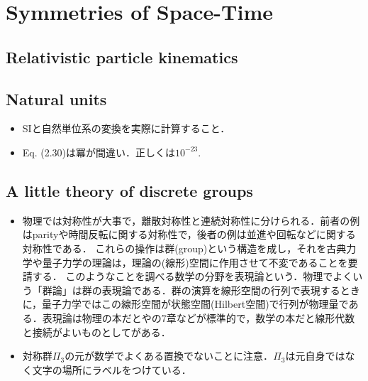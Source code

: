 \section{Symmetries of Space-Time}
\subsection{Relativistic particle kinematics}
\subsection{Natural units}
\begin{itemize}
		\item SIと自然単位系の変換を実際に計算すること．

		\item Eq. (2.30)は冪が間違い．正しくは$10^{-23} $.
\end{itemize}
\subsection{A little theory of discrete groups}
\begin{itemize}
	\item 物理では対称性が大事で，離散対称性と連続対称性に分けられる．前者の例はparityや時間反転に関する対称性で，後者の例は並進や回転などに関する対称性である．
	これらの操作は群(group)という構造を成し，それを古典力学や量子力学の理論は，理論の(線形)空間に作用させて不変であることを要請する．
	このようなことを調べる数学の分野を表現論という．物理でよくいう「群論」は群の表現論である．群の演算を線形空間の行列で表現するときに，量子力学ではこの線形空間が状態空間(Hilbert空間)で行列が物理量である．表現論は物理の本だと\cite{九後1989}や\cite{BN10398292}の7章などが標準的で，数学の本だと線形代数と接続がよいものとして\cite{BC13565134}がある．
		\item 対称群$\Pi_3 $の元が数学でよくある置換でないことに注意．$\Pi_3 $は元自身ではなく文字の場所にラベルをつけている．
\end{itemize}
